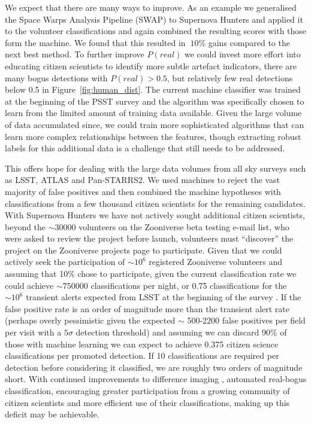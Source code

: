 \documentclass[a4paper,fleqn,usenatbib]{mnras}
\begin{document}
We expect that there are many ways to improve.  As an example we generalised the Space Warps Analysis Pipeline (SWAP) to Supernova Hunters and applied it to the volunteer classifications and again combined the resulting scores with those form the machine.  We found that this resulted in $~10$\% gains compared to the next best method.  To further improve $P(real)$ we could invest more effort into educating citizen scientists to identify more subtle artefact indicators, there are many bogus detections with $P(real)>0.5$, but relatively few real detections below 0.5 in Figure~\ref{fig:human_dist}.  The current machine classifier was trained at the beginning of the PSST survey and the algorithm was specifically chosen to learn from the limited amount of training data available.  Given the large volume of data accumulated since, we could train more sophisticated algorithms that can learn more complex relationships between the features, though extracting robust labels for this additional data is a challenge that still needs to be addressed. 

This offers hope for dealing with the large data volumes from all sky surveys such as LSST, ATLAS and Pan-STARRS2.  We used machines to reject the vast majority of false positives and then combined the machine hypotheses with classifications from a few thousand citizen scientists for the remaining candidates.  With Supernova Hunters we have not actively sought additional citizen scientists, beyond the $\sim30000$ volunteers on the Zooniverse beta testing e-mail list, who were asked to review the project before launch, volunteers must ``discover'' the project on the Zooniverse projects page to participate.  Given that we could actively seek the participation of $\sim 10^6$ registered Zooniverse volunteers and assuming that 10\% chose to participate, given the current classification rate we could achieve $\sim 750000$ classifications per night, or 0.75 classifications for the $\sim 10^6$ transient alerts expected from LSST at the beginning of the survey \citep{Ridgway14}.  If the false positive rate is an order of magnitude more than the transient alert rate (perhaps overly pessimistic given the expected $\sim$ 500-2200 false positives per field per visit \citep{Becker13} with a $5\sigma$ detection threshold) and assuming we can discard 90\% of those with machine learning we can expect to achieve 0.375 citizen science classifications per promoted detection.  If 10 classifications are required per detection before considering it classified, we are roughly two orders of magnitude short.  With continued improvements to difference imaging \citep{Zackay16}, automated real-bogus classification, encouraging greater participation from a growing community of citizen scientists and more efficient use of their classifications, making up this deficit may be achievable.

 

\end{document}

